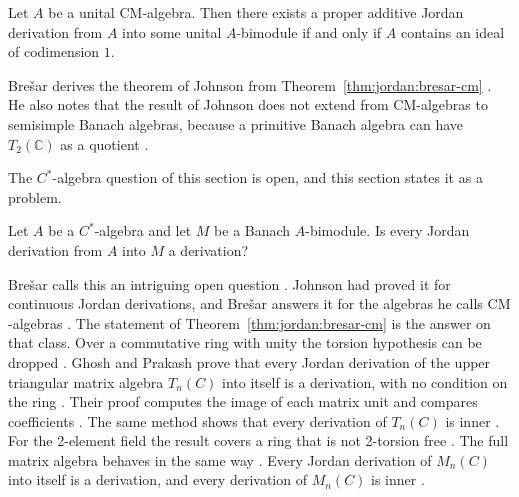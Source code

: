 \begin{theorem}\label{thm:jordan:bresar-cm}
Let $A$ be a unital $\mathrm{CM}$-algebra. Then there exists a proper additive Jordan derivation
from $A$ into some unital $A$-bimodule if and only if $A$ contains an ideal of codimension $1$.
\end{theorem}

Brešar derives the theorem of Johnson from Theorem~\ref{thm:jordan:bresar-cm}
\cite[p.~422]{Bresar2005}. He also notes that the result of Johnson does not
extend from $\mathrm{CM}$-algebras to semisimple Banach algebras, because a
primitive Banach algebra can have $T_2(\mathbb{C})$ as a quotient
\cite[p.~422]{Bresar2005}.

The $C^{*}$-algebra question of this section is open, and this section states
it as a problem.

\begin{problem}\label{prob:open:jordan-cstar}
Let $A$ be a $C^{*}$-algebra and let $M$ be a Banach $A$-bimodule.
Is every Jordan derivation from $A$ into $M$ a derivation?
\end{problem}

Bre\v{s}ar calls this an intriguing open question \cite[Section~5,
p.~421]{Bresar2005}. Johnson had proved it for continuous Jordan derivations,
and Bre\v{s}ar answers it for the algebras he calls $\mathrm{CM}$-algebras
\cite[p.~421]{Bresar2005}. The statement of Theorem~\ref{thm:jordan:bresar-cm}
is the answer on that class. Over a commutative ring with unity the torsion
hypothesis can be dropped \cite[Theorem~2.1, p.~3]{GhoshPrakash2018}. Ghosh
and Prakash prove that every Jordan derivation of the upper triangular matrix
algebra $T_n(C)$ into itself is a derivation, with no condition on the ring
\cite[Theorem~2.1, p.~3]{GhoshPrakash2018}. Their proof computes the image of
each matrix unit and compares coefficients \cite[pp.~3--4]{GhoshPrakash2018}.
The same method shows that every derivation of $T_n(C)$ is inner
\cite[Theorem~2.2, p.~5]{GhoshPrakash2018}. For the 2-element field the result
covers a ring that is not 2-torsion free \cite[Corollary~2.1,
p.~4]{GhoshPrakash2018}. The full matrix algebra behaves in the same way
\cite[Theorem~3.1, p.~5]{GhoshPrakash2018}. Every Jordan derivation of
$M_n(C)$ into itself is a derivation, and every derivation of $M_n(C)$ is
inner \cite[Theorem~3.2, p.~8]{GhoshPrakash2018}.

